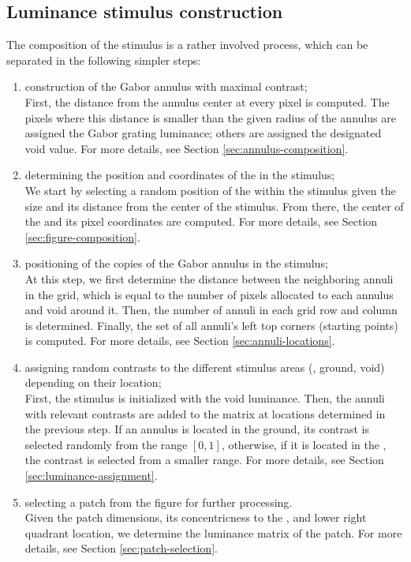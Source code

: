 \subsection{Luminance stimulus construction}
\label{sec:luminance-stim-construction}

The composition of the stimulus is a rather involved process, which can be separated in the following simpler steps:
\begin{enumerate}
    \item construction of the Gabor annulus with maximal contrast; \\
    First, the distance from the annulus center at every pixel is computed. The pixels where this distance is smaller than the given radius of the annulus are assigned the Gabor grating luminance; others are assigned the designated void value. For more details, see Section \ref{sec:annulus-composition}.
    
    \item determining the position and coordinates of the \stimfig{} in the stimulus; \\
    We start by selecting a random position of the \stimfig{} within the stimulus given the \stimfig{} size and its distance from the center of the stimulus. From there, the center of the \stimfig{} and its pixel coordinates are computed. For more details, see Section \ref{sec:figure-composition}.
    
    \item positioning of the copies of the Gabor annulus in the stimulus; \\
    At this step, we first determine the distance between the neighboring annuli in the grid, which is equal to the number of pixels allocated to each annulus and void around it. Then, the number of annuli in each grid row and column is determined. Finally, the set of all annuli's left top corners (starting points) is computed. For more details, see Section \ref{sec:annuli-locations}.
    
    \item assigning random contrasts to the different stimulus areas (\stimfig, ground, void) depending on their location; \\
    First, the stimulus is initialized with the void luminance. Then, the annuli with relevant contrasts are added to the matrix at locations determined in the previous step. If an annulus is located in the
    ground, its contrast is selected randomly from the range $[0, 1]$, otherwise, if it is located in the \stimfig, the contrast is selected from a smaller range. For more details, see Section \ref{sec:luminance-assignment}.
    
    \item selecting a patch from the figure for further processing. \\
    Given the patch dimensions, its concentricness to the \stimfig, and lower right quadrant location, we determine the luminance matrix of the patch.
    For more details, see Section \ref{sec:patch-selection}.
\end{enumerate}

